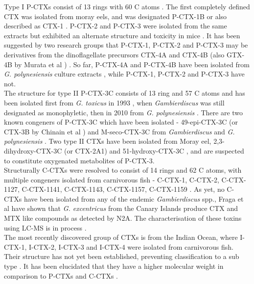 \documentclass[12pt]{article}
\begin{document}
Type I P-CTXs consist of 13 rings with 60 C atoms \cite{murata1990structures,lewis1991purification,lewis1993origin}. The first completely defined CTX was isolated from moray eels, and was designated P-CTX-1B \cite{murata1990structures} or also described as CTX-1 \cite{lewis1991purification}. P-CTX-2 and P-CTX-3 were isolated from the same extracts but exhibited an alternate structure and toxicity in mice \cite{lewis1991purification}. It has been suggested by two research groups that P-CTX-1, P-CTX-2 and P-CTX-3 may be derivatives from the dinoflagellate precursors CTX-4A and CTX-4B (also GTX-4B by Murata et al \cite{murata1990structures}) \cite{lewis1993origin,yasumoto2000structural}. So far, P-CTX-4A and P-CTX-4B have been isolated from \emph{G. polynesiensis} culture extracts \cite{chinain2010growth}, while P-CTX-1, P-CTX-2 and P-CTX-3 have not. \\

The structure for type II P-CTX-3C consists of 13 ring and 57 C atoms and has been isolated first from \emph{G. toxicus} in 1993 \cite{satake1993structure}, when \emph{Gambierdiscus} was still designated as monophyletic, then in 2010 from \emph{G. polynesiensis} \cite{chinain2010growth}. There are two known congeners of P-CTX-3C which have been isolated - 49-epi-CTX-3C (or CTX-3B by Chinain et al \cite{chinain2010growth}) and M-seco-CTX-3C from \emph{Gambierdiscus} \cite{satake1993structure} and \emph{G. polynesiensis} \cite{chinain2010growth}. Two type II CTXs have been isolated from Moray eel, 2,3-dihydroxy-CTX-3C (or CTX-2A1) and 51-hydroxy-CTX-3C \cite{satake1998isolation}, and are suspected to constitute oxygenated metabolites of P-CTX-3. \\ %

Structurally C-CTXs were resolved to consist of 14 rings and 62 C atoms, with multiple congeners isolated from carnivorous fish - C-CTX-1, C-CTX-2, C-CTX-1127, C-CTX-1141, C-CTX-1143, C-CTX-1157, C-CTX-1159 \cite{vernoux1997isolation,lewis1998structure,pottier2003identification,pottier2002characterisation}. As yet, no C-CTXs have been isolated from any of the endemic \emph{Gambierdiscus} spp., Fraga et al have shown that \emph{G. excentricus} from the Canary Islands produce CTX and MTX like compounds as detected by N2A. The characterisation of these toxins using LC-MS is in process \cite{fraga2011gambierdiscus}. \\

The most recently discovered group of CTXs is from the Indian Ocean, where I-CTX-1, I-CTX-2, I-CTX-3 and I-CTX-4 were isolated from carnivorous fish. Their structure has not yet been established, preventing classification to a sub type \cite{hamilton2002multiple,hamilton2002isolation}. It has been elucidated that they have a higher molecular weight in comparison to P-CTXs and C-CTXs \cite{caillaud2010update,hamilton2002multiple,hamilton2002isolation}. \\ %
\end{document}
